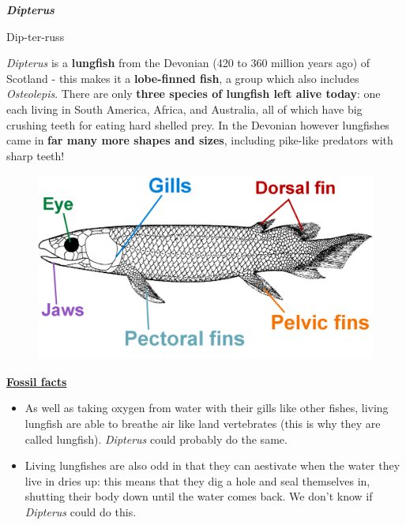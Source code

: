 \documentclass[12pt,letterpaper]{article}
\begin{document}

{\Huge\textbf{\textit{Dipterus}}\par}
\vspace{3mm}
{\large{Dip-ter-russ} \par} 
\vspace{5mm}
\textit{Dipterus} is a \textbf{lungfish} from the Devonian (420 to 360 million years ago) of Scotland - this makes it a \textbf{lobe-finned fish}, a group which also includes \textit{Osteolepis}.  There are only \textbf{three species of lungfish left alive today}: one each living in South America, Africa, and Australia, all of which have big crushing teeth for eating hard shelled prey. In the Devonian however lungfishes came in \textbf{far many more shapes and sizes}, including pike-like predators with sharp teeth!

\begin{figure}[h!]
\includegraphics[scale=1.2]{Dipterus}
\centering
\end{figure}

{\large\textbf{\underline{Fossil facts}}\par}

\begin{itemize}
  \item As well as taking oxygen from water with their gills like other fishes, living lungfish are able to breathe air like land vertebrates (this is why they are called lungfish).  \textit{Dipterus} could probably do the same.
  \item Living lungfishes are also odd in that they can aestivate when the water they live in dries up: this means that they dig a hole and seal themselves in, shutting their body down until the water comes back.  We don't know if \textit{Dipterus} could do this.
\end{itemize}
\end{document}
